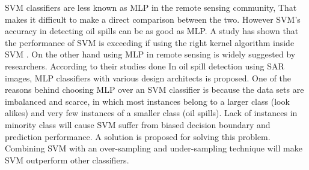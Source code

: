 SVM classifiers are less known as MLP in the remote sensing community, That makes it difficult to make a direct comparison between the two. 
However SVM's accuracy in detecting oil spills can be as good as MLP. A study has shown that the performance of SVM is exceeding if using the right kernel algorithm inside SVM \cite{liu2006boosting}. On the other hand using MLP in remote sensing is widely suggested by researchers\cite{Mera201472,Brekke200595,fingas2014review}. According to their studies done In oil spill detection using SAR images, MLP classifiers with various design architects is proposed. 
One of the reasons behind choosing MLP over an SVM classifier is because the data sets are imbalanced and scarce, in which most instances belong to a larger class (look alikes) and very few instances of a smaller class (oil spills). Lack of instances in minority class will cause SVM suffer from biased decision boundary and prediction performance. A solution is proposed for solving this problem. 
Combining SVM with an over-sampling and under-sampling technique will make SVM outperform other classifiers\cite{liu2006boosting}.

